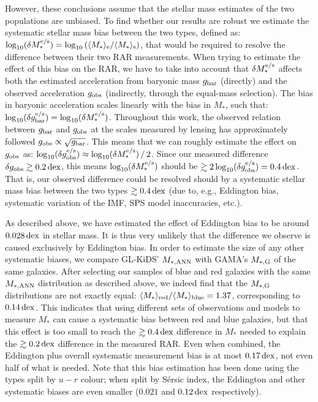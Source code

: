 \documentclass[usenatbib]{mnras}
\newcommand{\un}[1]{_{\rm #1}}
\newcommand{\dex}{\, {\rm dex}}
\begin{document}
However, these conclusions assume that the stellar mass estimates of the two populations are unbiased. To find whether our results are robust we estimate the systematic stellar mass bias between the two types, defined as: $\log_{10}(\delta M_*^{\rm e/s}) = \log_{10}\left( \langle M_*\rangle\un{e} / \langle M_*\rangle\un{s} \right)$, that would be required to resolve the difference between their two RAR measurements. When trying to estimate the effect of this bias on the RAR, we have to take into account that $\delta M^{\rm e/s}_*$ affects both the estimated acceleration from baryonic mass $g\un{bar}$ (directly) and the observed acceleration $g\un{obs}$ (indirectly, through the equal-mass selection). The bias in baryonic acceleration scales linearly with the bias in $M_*$, such that: $\log_{10}(\delta g^{\rm e/s}\un{bar}) = \log_{10}(\delta M^{\rm e/s}_*)$. Throughout this work, the observed relation between $g\un{bar}$ and $g\un{obs}$ at the scales measured by lensing has approximately followed $g\un{obs} \propto \sqrt{g\un{bar}}$. This means that we can roughly estimate the effect on $g\un{obs}$ as: $\log_{10}(\delta g^{\rm e/s}\un{obs}) \approx {\log_{10}(\delta M^{\rm e/s}_*)} \, / \, {2}$. Since our measured difference $\delta g\un{obs} \gtrsim 0.2 \dex$, this means ${\log_{10}(\delta M^{\rm e/s}_*)}$ should be  $\gtrsim 2 \log_{10}(\delta g^{\rm e/s}\un{obs}) = 0.4 \dex$. That is, our observed difference could be resolved should by a systematic stellar mass bias between the two types $\gtrsim 0.4 \dex$ (due to, e.g., Eddington bias, systematic variation of the IMF, SPS model inaccuracies, etc.).

As described above, we have estimated the effect of Eddington bias to be around $0.028 \dex$ in stellar mass. It is thus very unlikely that the difference we observe is caused exclusively by Eddington bias. In order to estimate the size of any other systematic biases, we compare GL-KiDS' $M\un{*,ANN}$ with GAMA's $M\un{*,G}$ of the same galaxies. After selecting our samples of blue and red galaxies with the same $M\un{*,ANN}$ distribution as described above, we indeed find that the $M\un{*,G}$ distributions are not exactly equal: $\langle M_* \rangle\un{red} / \langle M_*\rangle\un{blue} = 1.37$, corresponding to $0.14 \dex$. This indicates that using different sets of observations and models to measure $M_*$ can cause a systematic bias between red and blue galaxies, but that this effect is too small to reach the $\gtrsim 0.4 \dex$ difference in $M_*$ needed to explain the $\gtrsim 0.2 \dex$ difference in the measured RAR. Even when combined, the Eddington plus overall systematic measurement bias is at most $0.17 \dex$, not even half of what is needed. Note that this bias estimation has been done using the types split by $u-r$ colour; when split by S\'ersic index, the Eddington and other systematic biases are even smaller ($0.021$ and $0.12 \dex$ respectively).
\end{document}
